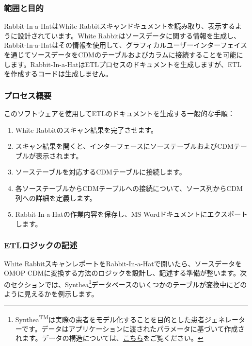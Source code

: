 \documentclass[
  11pt]{book}
\providecommand{\tightlist}{%
  \setlength{\itemsep}{0pt}\setlength{\parskip}{0pt}}
\theoremstyle{definition}
\theoremstyle{definition}
\theoremstyle{definition}
\theoremstyle{definition}
\theoremstyle{remark}
\begin{document}
\subsubsection*{範囲と目的}\label{ux7bc4ux56f2ux3068ux76eeux7684-1}

Rabbit-In-a-HatはWhite Rabbitスキャンドキュメントを読み取り、表示するように設計されています。White Rabbitはソースデータに関する情報を生成し、Rabbit-In-a-Hatはその情報を使用して、グラフィカルユーザーインターフェイスを通じてソースデータをCDMのテーブルおよびカラムに接続することを可能にします。Rabbit-In-a-HatはETLプロセスのドキュメントを生成しますが、ETLを作成するコードは生成しません。

\subsubsection*{プロセス概要}\label{ux30d7ux30edux30bbux30b9ux6982ux8981-1}

このソフトウェアを使用してETLのドキュメントを生成する一般的な手順：

\begin{enumerate}
\def\labelenumi{\arabic{enumi}.}
\tightlist
\item
  White Rabbitのスキャン結果を完了させます。
\item
  スキャン結果を開くと、インターフェースにソーステーブルおよびCDMテーブルが表示されます。
\item
  ソーステーブルを対応するCDMテーブルに接続します。
\item
  各ソーステーブルからCDMテーブルへの接続について、ソース列からCDM列への詳細を定義します。
\item
  Rabbit-In-a-Hatの作業内容を保存し、MS Wordドキュメントにエクスポートします。
\end{enumerate}

\subsubsection*{ETLロジックの記述}\label{etlux30edux30b8ux30c3ux30afux306eux8a18ux8ff0}

White RabbitスキャンレポートをRabbit-In-a-Hatで開いたら、ソースデータをOMOP CDMに変換する方法のロジックを設計し、記述する準備が整います。次のセクションでは、Synthea\footnote{Synthea\textsuperscript{TM}は実際の患者をモデル化することを目的とした患者ジェネレーターです。データはアプリケーションに渡されたパラメータに基づいて作成されます。データの構造については、\href{https://github.com/synthetichealth/synthea/wiki}{こちら}をご覧ください。}データベースのいくつかのテーブルが変換中にどのように見えるかを例示します。
\end{document}
